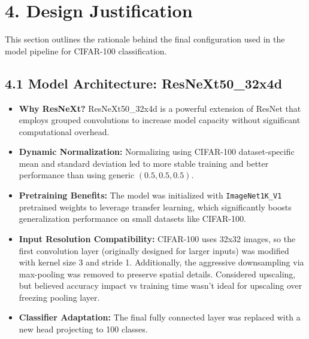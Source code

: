 \documentclass{article}
\begin{document}
\section*{4. Design Justification}

This section outlines the rationale behind the final configuration used in the model pipeline for CIFAR-100 classification.

\subsection*{4.1 Model Architecture: ResNeXt50\_32x4d}
\begin{itemize}
    \item \textbf{Why ResNeXt?} ResNeXt50\_32x4d is a powerful extension of ResNet that employs grouped convolutions to increase model capacity without significant computational overhead.
    \item \textbf{Dynamic Normalization:} Normalizing using CIFAR-100 dataset-specific mean and standard deviation led to more stable training and better performance than using generic $(0.5, 0.5, 0.5)$.
    \item \textbf{Pretraining Benefits:} The model was initialized with \texttt{ImageNet1K\_V1} pretrained weights to leverage transfer learning, which significantly boosts generalization performance on small datasets like CIFAR-100.
    \item \textbf{Input Resolution Compatibility:} CIFAR-100 uses 32x32 images, so the first convolution layer (originally designed for larger inputs) was modified with kernel size 3 and stride 1. Additionally, the aggressive downsampling via max-pooling was removed to preserve spatial details. Considered upscaling, but believed accuracy impact vs training time wasn't ideal for upscaling over freezing pooling layer.
    \item \textbf{Classifier Adaptation:} The final fully connected layer was replaced with a new head projecting to 100 classes.
\end{itemize}
\end{document}
